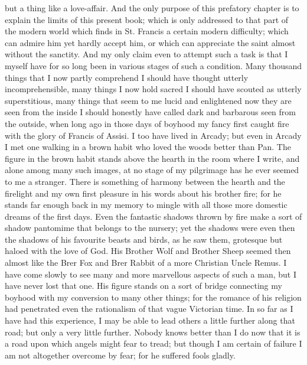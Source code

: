 \documentclass{book}
\begin{document}
but a thing like a love-affair. And the only purpose of this prefatory chapter is to explain the limits of this present book; which is only addressed to that part of the modern world which finds in St. Francis a certain modern difficulty; which can admire him yet hardly accept him, or which can appreciate the saint almost without the sanctity. And my only claim even to attempt such a task is that I myself have for so long been in various stages of such a condition. Many thousand things that I now partly comprehend I should have thought utterly incomprehensible, many things I now hold sacred I should have scouted as utterly superstitious, many things that seem to me lucid and enlightened now they are seen from the inside I should honestly have called dark and barbarous seen from the outside, when long ago in those days of boyhood my fancy first caught fire with the glory of Francis of Assisi. I too have lived in Arcady; but even in Arcady I met one walking in a brown habit who loved the woods better than Pan. The figure in the brown habit stands above the hearth in the room where I write, and alone among many such images, at no stage of my pilgrimage has he ever seemed to me a stranger. There is something of harmony between the hearth and the firelight and my own first pleasure in his words about his brother fire; for he stands far enough back in my memory to mingle with all those more domestic dreams of the first days. Even the fantastic shadows thrown by fire make a sort of shadow pantomime that belongs to the nursery; yet the shadows were even then the shadows of his favourite beasts and birds, as he saw them, grotesque but haloed with the love of God. His Brother Wolf and Brother Sheep seemed then almost like the Brer Fox and Brer Rabbit of a more Christian Uncle Remus. I have come slowly to see many and more marvellous aspects of such a man, but I have never lost that one. His figure stands on a sort of bridge connecting my boyhood with my conversion to many other things; for the romance of his religion had penetrated even the rationalism of that vague Victorian time. In so far as I have had this experience, I may be able to lead others a little further along that road; but only a very little further. Nobody knows better than I do now that it is a road upon which angels might fear to tread; but though I am certain of failure I am not altogether overcome by fear; for he suffered fools gladly.
\end{document}
